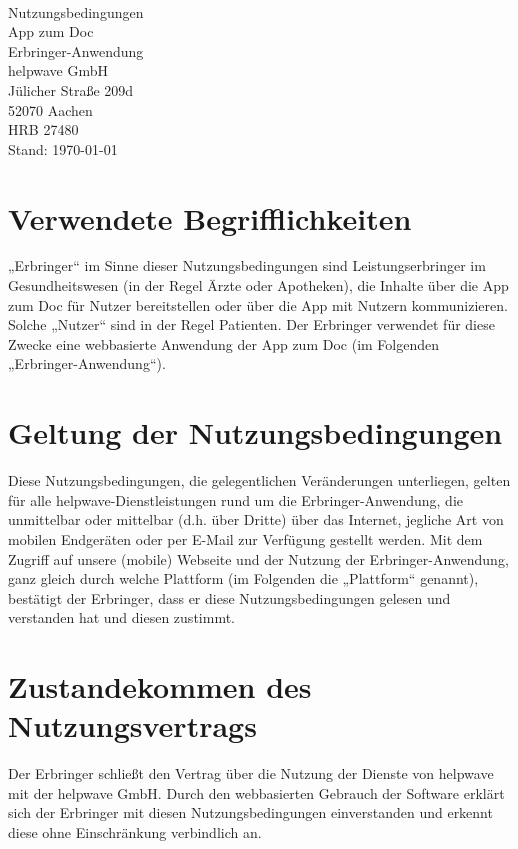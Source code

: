 \documentclass[10pt]{article}
\begin{document}
\begin{center}
	\\[4ex]
	{\Huge \sffamily
	Nutzungsbedingungen \\
	\huge App zum Doc \\[1ex] \Large Erbringer-Anwendung}\\[2ex]

	\vspace{1em}
	{\large
		helpwave GmbH \\
		Jülicher Straße 209d \\
		52070 Aachen \\
		HRB 27480}\\
	\vspace{1em}
	Stand: \today
\end{center}

\vspace{2ex}

\tableofcontents

\newpage

\section{Verwendete Begrifflichkeiten}
„Erbringer“ im Sinne dieser Nutzungsbedingungen sind Leistungserbringer im Gesundheitswesen (in der Regel Ärzte oder
Apotheken), die Inhalte über die App zum Doc für Nutzer bereitstellen oder über die App mit Nutzern kommunizieren. Solche
„Nutzer“ sind in der Regel Patienten. Der Erbringer verwendet für diese Zwecke eine webbasierte Anwendung der App zum
Doc (im Folgenden „Erbringer-Anwendung“).
\section{Geltung der Nutzungsbedingungen}
Diese Nutzungsbedingungen, die gelegentlichen Veränderungen unterliegen, gelten für alle helpwave-Dienstleistungen
rund um die Erbringer-Anwendung, die unmittelbar oder mittelbar (d.h. über Dritte) über das Internet, jegliche Art von mobilen Endgeräten oder per E-Mail zur Verfügung gestellt werden.
Mit dem Zugriff auf unsere (mobile) Webseite und der Nutzung der Erbringer-Anwendung, ganz gleich durch welche Plattform (im Folgenden die „Plattform“ genannt), bestätigt der Erbringer, dass er diese Nutzungsbedingungen gelesen und verstanden hat und diesen zustimmt.

\section{Zustandekommen des Nutzungsvertrags}
Der Erbringer schließt den Vertrag über die Nutzung der Dienste von helpwave mit der helpwave GmbH.
Durch den webbasierten Gebrauch der Software erklärt sich der Erbringer mit diesen Nutzungsbedingungen einverstanden
und erkennt diese ohne Einschränkung verbindlich an.
\end{document}
